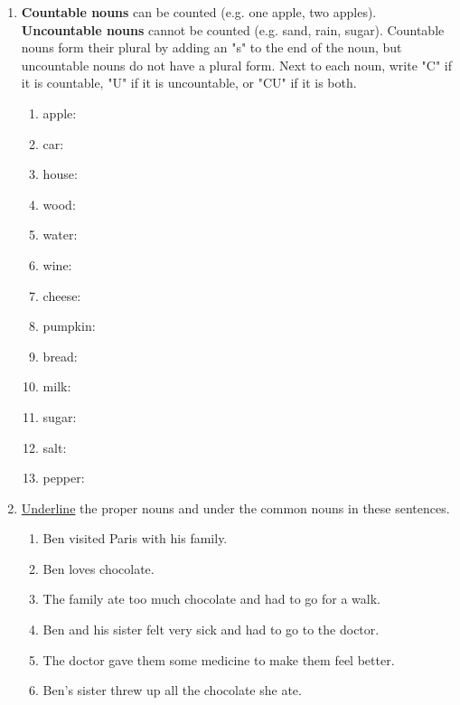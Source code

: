 \documentclass{tufte-book}
\begin{document}
\begin{enumerate}
  \item \textbf{Countable nouns} can be counted (e.g. one apple, two apples). \textbf{Uncountable nouns} cannot be counted (e.g. sand, rain, sugar).
  Countable nouns form their plural by adding an "s" to the end of the noun, but uncountable nouns do not have a plural form.
  Next to each noun, write "C" if it is countable, "U" if it is uncountable, or "CU" if it is both.
  \begin{multicols}{3}
  \begin{enumerate}
    \item apple: \dotfill
    \item car: \dotfill
    \item house: \dotfill
    \item wood: \dotfill
    \item water: \dotfill
    \item wine: \dotfill
    \item cheese: \dotfill
    \item pumpkin: \dotfill
    \item bread: \dotfill
    \item milk: \dotfill
    \item sugar: \dotfill
    \item salt: \dotfill
    \item pepper: \dotfill
  \end{enumerate}
  \end{multicols}

  \item \underline{Underline} the proper nouns and  under the common nouns in these sentences.
  \begin{enumerate}
    \item Ben visited Paris with his family.
    \item Ben loves chocolate.
    \item The family ate too much chocolate and had to go for a walk.
    \item Ben and his sister felt very sick and had to go to the doctor.
    \item The doctor gave them some medicine to make them feel better.
    \item Ben's sister threw up all the chocolate she ate.
  \end{enumerate}


\end{enumerate}
\end{document}
